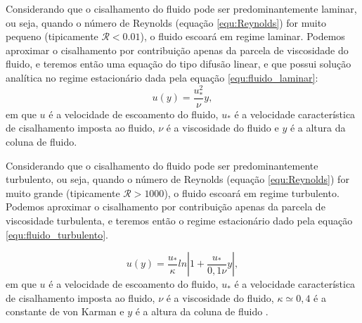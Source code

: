     Considerando que o cisalhamento do fluido pode ser predominantemente laminar, ou seja, quando o número de Reynolds (equação \ref{equ:Reynolds}) for muito pequeno (tipicamente $\mathcal{R}<0.01$), o fluido escoará em regime laminar. Podemos aproximar o cisalhamento por contribuição apenas da parcela de viscosidade do fluido, e teremos então uma equação do tipo difusão linear, e que possui solução analítica no regime estacionário dada pela equação \ref{equ:fluido_laminar}:
\begin{equation}
    \label{equ:fluido_laminar}
    u(y) = \frac{u_{*}^{2}}{\nu}y,
\end{equation}
em que $u$ é a velocidade de escoamento do fluido, $u_{*}$ é a velocidade característica de cisalhamento imposta ao fluido, $\nu$ é a viscosidade do fluido e $y$ é a altura da coluna de fluido.


    Considerando que o cisalhamento do fluido pode ser predominantemente turbulento, ou seja, quando o número de Reynolds (equação \ref{equ:Reynolds}) for muito grande (tipicamente $\mathcal{R}>1000$), o fluido escoará em regime turbulento. Podemos aproximar o cisalhamento por contribuição apenas da parcela de viscosidade turbulenta, e teremos então o regime estacionário dado pela equação \ref{equ:fluido_turbulento}.

\begin{equation}
    \label{equ:fluido_turbulento}
    u(y) = \frac{u_{*}}{\kappa} ln\left|1+\frac{u_{*}}{0,1\nu}y\right|,
\end{equation}
em que $u$ é a velocidade de escoamento do fluido, $u_{*}$ é a velocidade característica de cisalhamento imposta ao fluido, $\nu$ é a viscosidade do fluido, $\kappa \simeq 0,4$ é a constante de von Karman e $y$ é a altura da coluna de fluido \cite{Numerical_simulation_of_turbulent_sediment_transport}.

